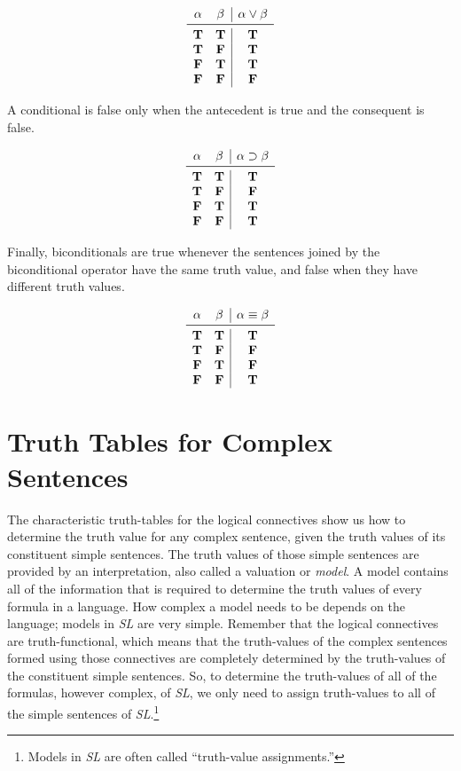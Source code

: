 \documentclass[../logic-text.tex]{subfiles}
\begin{document}
\[
\begin{array}{cc|c}
  \alpha & \beta & \alpha  \lor   \beta \\ \midrule
  \true & \true &  \true  \\
  \true & \false &  \true  \\
  \false & \true &  \true  \\
  \false & \false &  \false
\end{array}
\]


A conditional is false only when the antecedent is true and the consequent is false.

\[
\begin{array}{cc|c}
  \alpha & \beta & \alpha  \lif   \beta \\ \midrule
  \true & \true &  \true  \\
  \true & \false &  \false  \\
  \false & \true &  \true  \\
  \false & \false &  \true
\end{array}
\]


Finally, biconditionals are true whenever the sentences joined by the biconditional operator have the same truth value, and false when they have different truth values.


\[
\begin{array}{cc|c}
  \alpha & \beta & \alpha  \liff \beta \\ \midrule
  \true & \true &  \true  \\
  \true & \false &  \false  \\
  \false & \true &  \false  \\
  \false & \false &  \true
\end{array}
\]

\section{Truth Tables for Complex Sentences}
\label{sec:truth-tables-complex}


The characteristic truth-tables for the logical connectives show us how to determine the truth value for any complex sentence, given the truth values of its constituent simple sentences.
The truth values of those simple sentences are provided by an interpretation, also called a valuation or \emph{model}.
A model contains all of the information that is required to determine the truth values of every formula in a language.
How complex a model needs to be depends on the language; models in \emph{SL} are very simple.
Remember that the logical connectives are truth-functional, which means that the truth-values of the complex sentences formed using those connectives are completely determined by the truth-values of the constituent simple sentences.
So, to determine the truth-values of all of the formulas, however complex, of \emph{SL}, we only need to assign truth-values to all of the simple sentences of \emph{SL}.\footnote{Models in \emph{SL} are often called \enquote{truth-value assignments.}}
\end{document}
